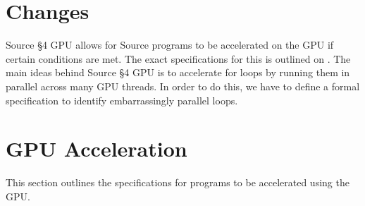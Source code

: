 





\section*{Changes}

Source \S 4 GPU allows for Source programs to be accelerated on the GPU if certain conditions are met.
The exact specifications for this is outlined on \pageref{gpu_supp}. The main ideas behind Source \S 4 GPU 
is to accelerate for loops by running them in parallel across many GPU threads. In order to do this, we have to
define a formal specification to identify embarrassingly parallel loops.





\newpage































\newpage

\section*{GPU Acceleration}
\label{gpu_supp}
This section outlines the specifications for programs to be accelerated using the GPU.\


\newpage

